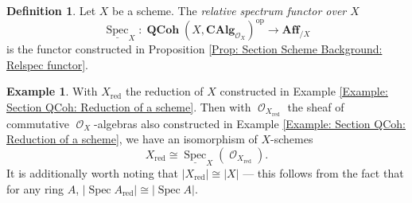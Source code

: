 \documentclass{amsart}
\theoremstyle{definition}
\newtheorem{example}[equation]{Example}
\newtheorem{definition}[equation]{Definition}
\DeclareMathOperator{\Ocal}{\mathcal{O}}
\DeclareMathOperator{\op}{op}
\DeclareMathOperator{\Spec}{Spec}
\DeclareMathOperator{\red}{red}
\newcommand{\CAlg}[1]{\mathbf{CAlg}_{#1}}
\newcommand{\RelSpec}[1]{\underline{\Spec}_{#1}}
\DeclareMathOperator{\QCoh}{\mathbf{QCoh}}
\numberwithin{equation}{subsection}
\begin{document}
\begin{definition}\label{Defn: Section Scheme Background: Relspec functor}
Let $X$ be a scheme. The \emph{relative spectrum functor over $X$}
\[
\RelSpec{X}:\QCoh(X,\CAlg{\Ocal_X})^{\op} \to \mathbf{Aff}_{/X}
\] 
is the functor constructed in Proposition \ref{Prop: Section Scheme Background: Relspec functor}.
\end{definition}
\begin{example}
With $X_{\red}$ the reduction of $X$ constructed in Example \ref{Example: Section QCoh: Reduction of a scheme}. Then with $\Ocal_{X_{\red}}$ the sheaf of commutative $\Ocal_X$-algebras also constructed in Example \ref{Example: Section QCoh: Reduction of a scheme}, we have an isomorphism of $X$-schemes
\[
X_{\red} \cong \RelSpec{X}(\Ocal_{X_{\red}}).
\]
It is additionally worth noting that $\lvert X_{\red} \rvert \cong \lvert X \rvert$ --- this follows from the fact that for any ring $A$, $\lvert \Spec A_{\red} \rvert \cong \lvert \Spec A \rvert$.
\end{example}
\end{document}
